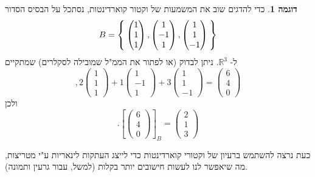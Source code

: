 \documentclass[12pt]{report}
\theoremstyle{plain}
\theoremstyle{definition}
\newtheorem{example}{דוגמה}[chapter]
\newcommand{\R}{\mathbb{R}}
\newcommand{\0}{\mathbf{0}}
\begin{document}
\begin{example}
כדי להדגים שוב את המשמעות של וקטור קוארדינטות, נסתכל על הבסיס הסדור
$$
B=\Set{\begin{pmatrix}1\\1\\1\end{pmatrix},\begin{pmatrix}1\\-1\\1\end{pmatrix},\begin{pmatrix}1\\1\\-1\end{pmatrix}}
$$
ל-
$\R^3$.
ניתן לבדוק (או לפתור את הממ"ל שמובילה לסקלרים) שמתקיים
$$
,2\begin{pmatrix}1\\1\\1\end{pmatrix}+1\begin{pmatrix}1\\-1\\1\end{pmatrix}+3\begin{pmatrix}1\\1\\-1\end{pmatrix}=\begin{pmatrix}6\\4\\0\end{pmatrix}
$$
ולכן
$$
.\left[\begin{pmatrix}6\\4\\0\end{pmatrix}\right]_B=\begin{pmatrix}2\\1\\3\end{pmatrix}
$$
\end{example}

כעת נרצה להשתמש ברעיון של וקטורי קוארדינטות כדי לייצג העתקות לינאריות ע"י מטריצות, מה שיאפשר לנו לעשות חישובים יותר בקלות (למשל, עבור גרעין ותמונה).
\end{document}
